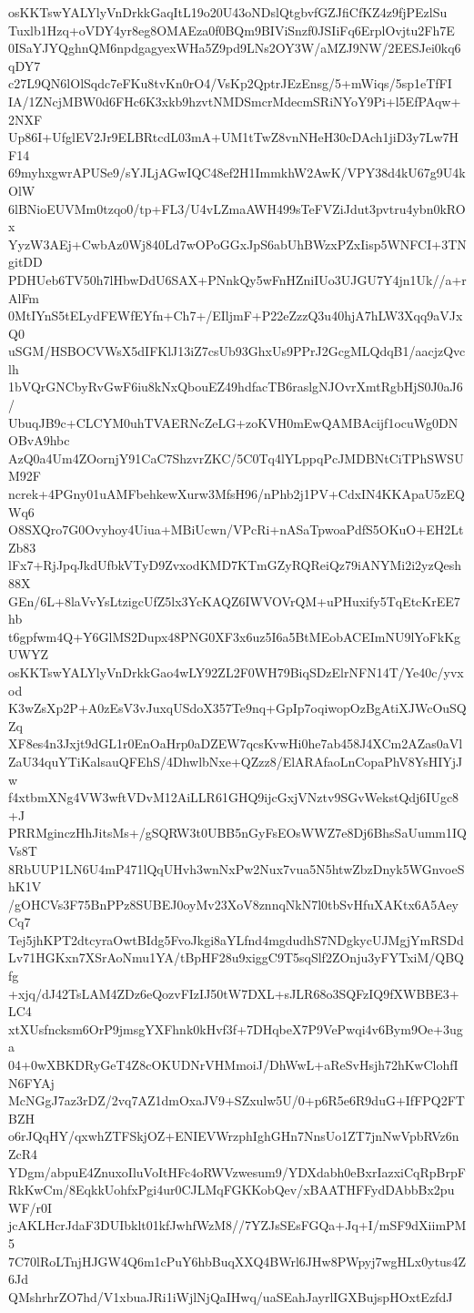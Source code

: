 osKKTswYALYlyVnDrkkGaqItL19o20U43oNDslQtgbvfGZJfiCfKZ4z9fjPEzlSu
Tuxlb1Hzq+oVDY4yr8eg8OMAEza0f0BQm9BIViSnzf0JSIiFq6ErplOvjtu2Fh7E
0ISaYJYQghnQM6npdgagyexWHa5Z9pd9LNs2OY3W/aMZJ9NW/2EESJei0kq6qDY7
c27L9QN6lOlSqdc7eFKu8tvKn0rO4/VsKp2QptrJEzEnsg/5+mWiqs/5sp1eTfFI
IA/1ZNcjMBW0d6FHc6K3xkb9hzvtNMDSmcrMdecmSRiNYoY9Pi+l5EfPAqw+2NXF
Up86I+UfglEV2Jr9ELBRtcdL03mA+UM1tTwZ8vnNHeH30cDAch1jiD3y7Lw7HF14
69myhxgwrAPUSe9/sYJLjAGwIQC48ef2H1ImmkhW2AwK/VPY38d4kU67g9U4kOlW
6lBNioEUVMm0tzqo0/tp+FL3/U4vLZmaAWH499sTeFVZiJdut3pvtru4ybn0kROx
YyzW3AEj+CwbAz0Wj840Ld7wOPoGGxJpS6abUhBWzxPZxIisp5WNFCI+3TNgitDD
PDHUeb6TV50h7lHbwDdU6SAX+PNnkQy5wFnHZniIUo3UJGU7Y4jn1Uk//a+rAlFm
0MtIYnS5tELydFEWfEYfn+Ch7+/EIljmF+P22eZzzQ3u40hjA7hLW3Xqq9aVJxQ0
uSGM/HSBOCVWsX5dIFKlJ13iZ7csUb93GhxUs9PPrJ2GcgMLQdqB1/aacjzQvclh
1bVQrGNCbyRvGwF6iu8kNxQbouEZ49hdfacTB6raslgNJOvrXmtRgbHjS0J0aJ6/
UbuqJB9c+CLCYM0uhTVAERNcZeLG+zoKVH0mEwQAMBAcijf1ocuWg0DNOBvA9hbc
AzQ0a4Um4ZOornjY91CaC7ShzvrZKC/5C0Tq4lYLppqPcJMDBNtCiTPhSWSUM92F
ncrek+4PGny01uAMFbehkewXurw3MfsH96/nPhb2j1PV+CdxIN4KKApaU5zEQWq6
O8SXQro7G0Ovyhoy4Uiua+MBiUcwn/VPcRi+nASaTpwoaPdfS5OKuO+EH2LtZb83
lFx7+RjJpqJkdUfbkVTyD9ZvxodKMD7KTmGZyRQReiQz79iANYMi2i2yzQesh88X
GEn/6L+8laVvYsLtzigcUfZ5lx3YcKAQZ6IWVOVrQM+uPHuxify5TqEtcKrEE7hb
t6gpfwm4Q+Y6GlMS2Dupx48PNG0XF3x6uz5I6a5BtMEobACEImNU9lYoFkKgUWYZ
osKKTswYALYlyVnDrkkGao4wLY92ZL2F0WH79BiqSDzElrNFN14T/Ye40c/yvxod
K3wZsXp2P+A0zEsV3vJuxqUSdoX357Te9nq+GpIp7oqiwopOzBgAtiXJWcOuSQZq
XF8es4n3Jxjt9dGL1r0EnOaHrp0aDZEW7qcsKvwHi0he7ab458J4XCm2AZas0aVl
ZaU34quYTiKalsauQFEhS/4DhwlbNxe+QZzz8/ElARAfaoLnCopaPhV8YsHIYjJw
f4xtbmXNg4VW3wftVDvM12AiLLR61GHQ9ijcGxjVNztv9SGvWekstQdj6IUgc8+J
PRRMginczHhJitsMs+/gSQRW3t0UBB5nGyFsEOsWWZ7e8Dj6BhsSaUumm1IQVs8T
8RbUUP1LN6U4mP471lQqUHvh3wnNxPw2Nux7vua5N5htwZbzDnyk5WGnvoeShK1V
/gOHCVs3F75BnPPz8SUBEJ0oyMv23XoV8znnqNkN7l0tbSvHfuXAKtx6A5AeyCq7
Tej5jhKPT2dtcyraOwtBIdg5FvoJkgi8aYLfnd4mgdudhS7NDgkycUJMgjYmRSDd
Lv71HGKxn7XSrAoNmu1YA/tBpHF28u9xiggC9T5sqSlf2ZOnju3yFYTxiM/QBQfg
+xjq/dJ42TsLAM4ZDz6eQozvFIzIJ50tW7DXL+sJLR68o3SQFzIQ9fXWBBE3+LC4
xtXUsfncksm6OrP9jmsgYXFhnk0kHvf3f+7DHqbeX7P9VePwqi4v6Bym9Oe+3uga
04+0wXBKDRyGeT4Z8cOKUDNrVHMmoiJ/DhWwL+aReSvHsjh72hKwClohfIN6FYAj
McNGgJ7az3rDZ/2vq7AZ1dmOxaJV9+SZxulw5U/0+p6R5e6R9duG+IfFPQ2FTBZH
o6rJQqHY/qxwhZTFSkjOZ+ENIEVWrzphIghGHn7NnsUo1ZT7jnNwVpbRVz6nZcR4
YDgm/abpuE4ZnuxoIluVoItHFc4oRWVzwesum9/YDXdabh0eBxrIazxiCqRpBrpF
RkKwCm/8EqkkUohfxPgi4ur0CJLMqFGKKobQev/xBAATHFFydDAbbBx2puWF/r0I
jcAKLHcrJdaF3DUIbklt01kfJwhfWzM8//7YZJsSEsFGQa+Jq+I/mSF9dXiimPM5
7C70lRoLTnjHJGW4Q6m1cPuY6hbBuqXXQ4BWrl6JHw8PWpyj7wgHLx0ytus4Z6Jd
QMshrhrZO7hd/V1xbuaJRi1iWjlNjQaIHwq/uaSEahJayrlIGXBujspHOxtEzfdJ

